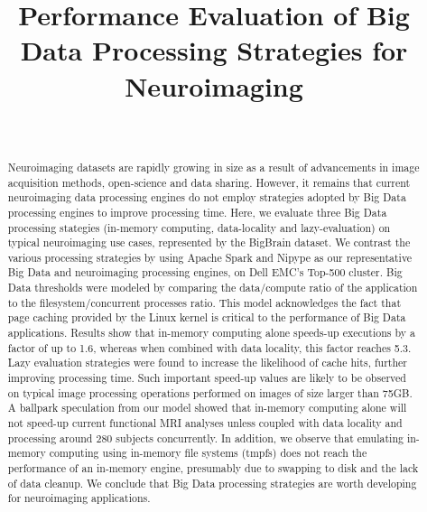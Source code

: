 \documentclass{IEEEtran}
\begin{document}
\title{Performance Evaluation of Big Data Processing Strategies for Neuroimaging}

\author{
  \\
}

\maketitle

\begin{abstract}
    Neuroimaging datasets are rapidly growing in size as a result of 
    advancements in image acquisition methods, open-science and data sharing. 
    However, it remains that current neuroimaging data processing engines do 
    not employ strategies adopted by Big Data processing engines to improve 
    processing time. Here, we 
    evaluate three Big Data processing stategies (in-memory computing, 
    data-locality and lazy-evaluation) on typical neuroimaging use 
    cases, represented by the BigBrain dataset. We contrast the various 
    processing strategies by using Apache Spark and Nipype as our 
    representative Big Data and neuroimaging processing engines, on Dell EMC's 
    Top-500 cluster. 
    Big Data thresholds were modeled by comparing the data/compute ratio of the 
    application to the filesystem/concurrent processes ratio. 
    This model acknowledges the 
fact that page caching provided by the Linux kernel is critical to the 
performance of Big Data applications. Results show that in-memory 
computing alone speeds-up executions by a factor of up to 1.6, whereas 
when combined with data locality, this factor reaches 5.3. Lazy evaluation strategies
were found to increase the likelihood of cache hits, further improving processing time. Such important 
speed-up values are likely to be observed on typical image processing 
operations performed on images of size larger than 75GB. A ballpark 
speculation from our model showed that in-memory computing alone will
not speed-up current 
functional MRI analyses unless coupled with data 
locality and processing around 280 subjects concurrently. 
    In addition, we observe that emulating in-memory computing 
using in-memory file systems (tmpfs) does not reach the performance of 
an in-memory engine, presumably due to swapping to disk and the lack of data cleanup.
We conclude that Big Data processing strategies are 
worth developing for neuroimaging 
applications. 
\end{abstract}
\end{document}
